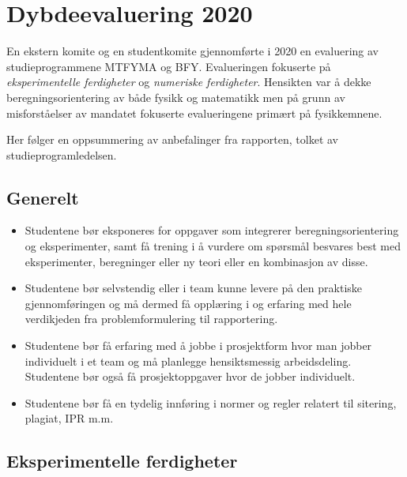 \section{Dybdeevaluering 2020}
\label{sec:evaluation2020}

En ekstern komite og en studentkomite gjennomførte i 2020 en evaluering av studieprogrammene MTFYMA og BFY. Evalueringen fokuserte på \emph{eksperimentelle ferdigheter} og \emph{numeriske ferdigheter}. Hensikten var å dekke beregningsorientering av både fysikk og matematikk men på grunn av misforståelser av mandatet fokuserte evalueringene primært på fysikkemnene.

Her følger en oppsummering av anbefalinger fra rapporten, tolket av studieprogramledelsen.

\subsection{Generelt}

\begin{itemize}
	\item Studentene bør eksponeres for oppgaver som integrerer beregningsorientering og eksperimenter, samt få trening i å vurdere om spørsmål besvares best med eksperimenter, beregninger eller ny teori eller en kombinasjon av disse.
	\item Studentene bør selvstendig eller i team kunne levere på den praktiske gjennomføringen og må dermed få opplæring i og erfaring med hele verdikjeden fra problemformulering til rapportering.
	\item Studentene bør få erfaring med å jobbe i prosjektform hvor man jobber individuelt i et team og må planlegge hensiktsmessig arbeidsdeling. Studentene bør også få prosjektoppgaver hvor de jobber individuelt.
	\item Studentene bør få en tydelig innføring i normer og regler relatert til sitering, plagiat, IPR m.m.
\end{itemize}

\subsection{Eksperimentelle ferdigheter}

